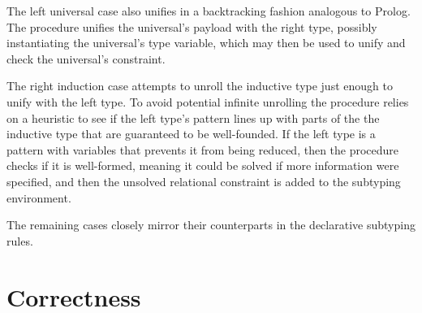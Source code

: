 \documentclass[acmsmall]{acmart}
\theoremstyle{definition}
\begin{document}
The left universal case also unifies in a backtracking fashion analogous to Prolog.
The procedure unifies the universal's payload with the right type,
possibly instantiating the universal's type variable,
which may then be used to unify and check the universal's constraint.

The right induction case attempts to unroll the inductive type just enough
to unify with the left type. To avoid potential infinite unrolling
the procedure relies on a heuristic to see if the left type's pattern
lines up with parts of the the inductive type that are guaranteed to be well-founded. 
If the left type is a pattern with variables that prevents it from being reduced,
then the procedure checks if it is well-formed, meaning it could be solved 
if more information were specified, and then the unsolved relational constraint
is added to the subtyping environment. 

The remaining cases closely mirror their counterparts in the declarative subtyping rules.


\section{Correctness}

\end{document}
